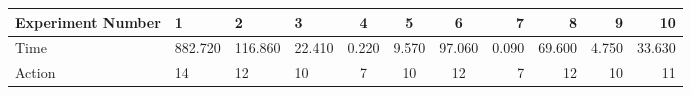 \documentclass[8pt]{article}
\begin{document}
\begin{landscape}
\begin{tabular}{ | l | l | l | l | c | c | c | r | r | r | r | }
 \hline 
Experiment Number & 1 & 2 & 3 & 4 & 5 & 6 & 7 & 8 & 9 & 10\\ \hline
Time & 882.720 & 116.860 & 22.410 & 0.220 & 9.570 & 97.060 & 0.090 & 69.600 & 4.750 & 33.630\\ \hline
Action & 14 & 12 & 10 & 7 & 10 & 12 & 7 & 12 & 10 & 11\\ \hline\end{tabular}
\end{landscape}
\end{document}
